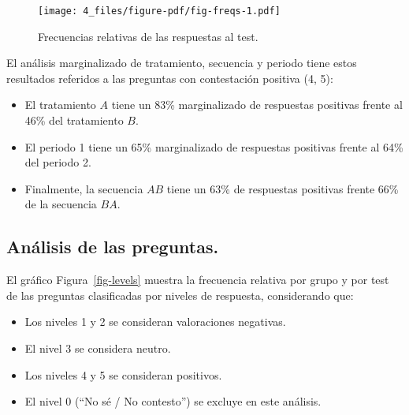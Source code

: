 \documentclass[
  12pt,
  a4paper,
  extrafontsizes,
  onecolumn,
  openright]{memoir}
\providecommand{\tightlist}{%
  \setlength{\itemsep}{0pt}\setlength{\parskip}{0pt}}\usepackage{longtable,booktabs,array}
\begin{document}
\begin{figure}[h]

{\centering \texttt{[image: 4\_files/figure-pdf/fig-freqs-1.pdf]}

}

\caption{\label{fig-freqs}Frecuencias relativas de las respuestas al
test.}

\end{figure}

El análisis marginalizado de tratamiento, secuencia y periodo tiene
estos resultados referidos a las preguntas con contestación positiva (4,
5):

\begin{itemize}
\item
  El tratamiento \(A\) tiene un 83\% marginalizado de respuestas
  positivas frente al 46\% del tratamiento \(B\).
\item
  El periodo 1 tiene un 65\% marginalizado de respuestas positivas
  frente al 64\% del periodo 2.
\item
  Finalmente, la secuencia \(AB\) tiene un 63\% de respuestas positivas
  frente 66\% de la secuencia \(BA\).
\end{itemize}

\hypertarget{anuxe1lisis-de-las-preguntas.}{%
\subsection{Análisis de las
preguntas.}\label{anuxe1lisis-de-las-preguntas.}}

El gráfico Figura~\ref{fig-levels} muestra la frecuencia relativa por
grupo y por test de las preguntas clasificadas por niveles de respuesta,
considerando que:

\begin{itemize}
\tightlist
\item
  Los niveles 1 y 2 se consideran valoraciones negativas.
\item
  El nivel 3 se considera neutro.
\item
  Los niveles 4 y 5 se consideran positivos.
\item
  El nivel 0 (\enquote{No sé / No contesto}) se excluye en este
  análisis.
\end{itemize}
\end{document}
